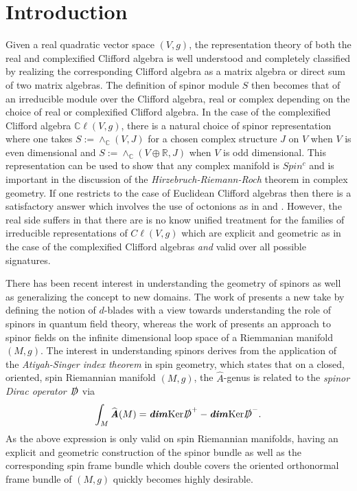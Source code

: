 \documentclass[openany, 11pt]{article}
\theoremstyle{definition}
\theoremstyle{remark}
\def\bC{\ensuremath{\mathbb{C}}}
\def\bR{\ensuremath{\mathbb{R}}}
\begin{document}
\section{Introduction}
Given a real quadratic vector space $(V,g)$, the representation theory of both the real and complexified Clifford algebra is well understood and completely classified by realizing the corresponding Clifford algebra as a matrix algebra or direct sum of two matrix algebras. The definition of spinor module $S$ then becomes that of an irreducible module over the Clifford algebra, real or complex depending on the choice of real or complexified Clifford algebra. In the case of the complexified Clifford algebra $\bC\ell(V,g)$, there is a natural choice of spinor representation where one takes $S:=\wedge_{\bC}(V,J)$ for a chosen complex structure $J$ on $V$ when $V$ is even dimensional and $S:=\wedge_{\bC}(V\oplus\bR,J)$ when $V$ is odd dimensional. This representation can be used to show that any complex manifold is $Spin^c$ and is important in the discussion of the \emph{Hirzebruch-Riemann-Roch} theorem in complex geometry. If one restricts to the case of Euclidean Clifford algebras then there is a satisfactory answer which involves the use of octonions as in \cite{E} and \cite{RB}.  However, the real side suffers in that there are is no know unified treatment for the families of irreducible representations of $C\ell(V,g)$ which are explicit and geometric as in the case of the complexified Clifford algebras \emph{and} valid over all possible signatures. \par
There has been recent interest in understanding the geometry of spinors as well as generalizing the concept to new domains. The work of \cite{DER} presents a new take by defining the notion of $d$-blades with a view towards understanding the role of spinors in quantum field theory, whereas the work of \cite{L} presents an approach to spinor fields on the infinite dimensional loop space of a Riemmanian manifold $(M,g)$. The interest in understanding spinors derives from the application of the \emph{Atiyah-Singer index theorem} in spin geometry, which states that on a closed, oriented, spin Riemannian manifold $(M,g)$, the $\hat{A}$-genus is related to the \emph{spinor Dirac operator $\slashed{D}$} via 
\[
    \int_M\widehat{\textbf{\emph{A}}}(M)=\textbf{\emph{dim}}\text{Ker}\slashed{D}^+-\textbf{\emph{dim}}\text{Ker}\slashed{D}^-.
\]
As the above expression is only valid on spin Riemannian manifolds, having an explicit and geometric construction of the spinor bundle as well as the corresponding spin frame bundle which double covers the oriented orthonormal frame bundle of $(M,g)$ quickly becomes highly desirable.\par
\end{document}
